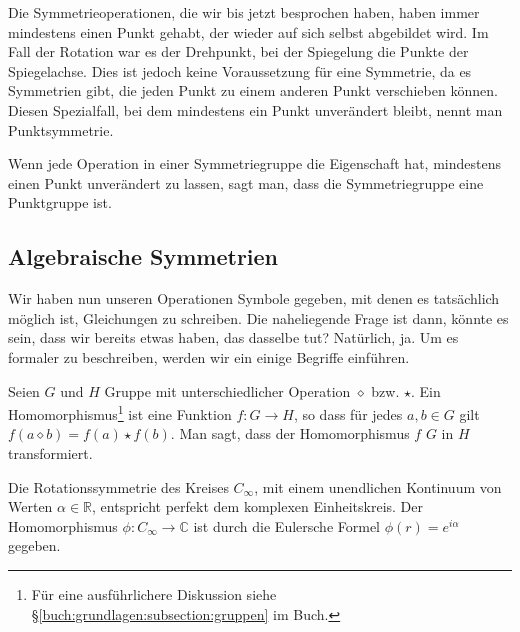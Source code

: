 Die Symmetrieoperationen, die wir bis jetzt besprochen haben, haben immer
mindestens einen Punkt gehabt, der wieder auf sich selbst abgebildet wird. Im
Fall der Rotation war es der Drehpunkt, bei der Spiegelung die Punkte der
Spiegelachse. Dies ist jedoch keine Voraussetzung für eine Symmetrie, da es
Symmetrien gibt, die jeden Punkt zu einem anderen Punkt verschieben können.
Diesen Spezialfall, bei dem mindestens ein Punkt unverändert bleibt, nennt man
Punktsymmetrie.
\begin{definition}[Punktgruppe]
	Wenn jede Operation in einer Symmetriegruppe die Eigenschaft hat, mindestens
	einen Punkt unverändert zu lassen, sagt man, dass die Symmetriegruppe eine
	Punktgruppe ist.
\end{definition}

\subsection{Algebraische Symmetrien}
Wir haben nun unseren Operationen Symbole gegeben, mit denen es tatsächlich
möglich ist, Gleichungen zu schreiben. Die naheliegende Frage ist dann, könnte
es sein, dass wir bereits etwas haben, das dasselbe tut?  Natürlich, ja.
Um es formaler zu beschreiben, werden wir ein einige Begriffe einführen.
\begin{definition}[Gruppenhomomorphismus]
	Seien \(G\) und \(H\) Gruppe mit unterschiedlicher Operation \(\diamond\)
	bzw.  \(\star\). Ein Homomorphismus\footnote{ Für eine ausführlichere
	Diskussion siehe \S\ref{buch:grundlagen:subsection:gruppen} im Buch.} ist
	eine Funktion \(f: G \to H\), so dass für jedes \(a, b \in G\) gilt
	\(f(a\diamond b) = f(a) \star f(b)\).  Man sagt, dass der Homomorphismus
	\(f\) \(G\) in \(H\) transformiert.
\end{definition}
\begin{beispiel}
	Die Rotationssymmetrie des Kreises \(C_\infty\), mit einem unendlichen
	Kontinuum von Werten \(\alpha \in \mathbb{R}\), entspricht perfekt dem
	komplexen Einheitskreis. Der Homomorphismus \(\phi: C_\infty \to \mathbb{C}\)
	ist durch die Eulersche Formel \(\phi(r) = e^{i\alpha}\) gegeben.
\end{beispiel}

